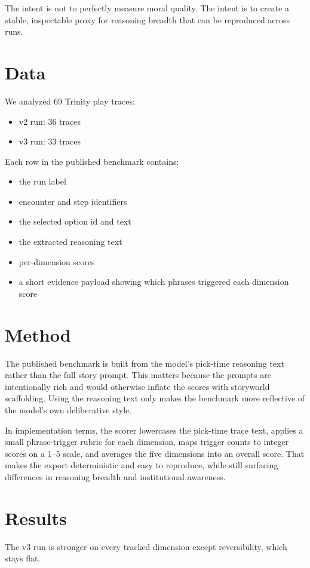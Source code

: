 \documentclass[11pt]{article}
\begin{document}
The intent is not to perfectly measure moral quality. The intent is to create a stable, inspectable proxy for reasoning breadth that can be reproduced across runs.

\section{Data}
We analyzed 69 Trinity play traces:
\begin{itemize}
  \item v2 run: 36 traces
  \item v3 run: 33 traces
\end{itemize}

Each row in the published benchmark contains:
\begin{itemize}
  \item the run label
  \item encounter and step identifiers
  \item the selected option id and text
  \item the extracted reasoning text
  \item per-dimension scores
  \item a short evidence payload showing which phrases triggered each dimension score
\end{itemize}

\section{Method}
The published benchmark is built from the model's pick-time reasoning text rather than the full story prompt. This matters because the prompts are intentionally rich and would otherwise inflate the scores with storyworld scaffolding. Using the reasoning text only makes the benchmark more reflective of the model's own deliberative style.

In implementation terms, the scorer lowercases the pick-time trace text, applies a small phrase-trigger rubric for each dimension, maps trigger counts to integer scores on a 1--5 scale, and averages the five dimensions into an overall score. That makes the export deterministic and easy to reproduce, while still surfacing differences in reasoning breadth and institutional awareness.

\section{Results}
The v3 run is stronger on every tracked dimension except reversibility, which stays flat.
\end{document}

